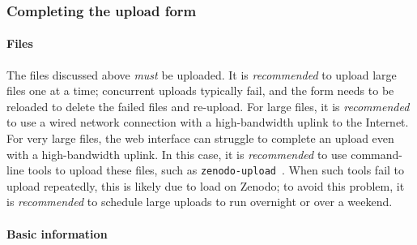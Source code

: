 \documentclass{article}
\newcommand\rfcword[1]{\emph{#1}\xspace}
\newcommand\must{\rfcword{must}}
\newcommand\recommended{\rfcword{recommended}}
\begin{document}
\subsubsection{Completing the upload form}\label{sec:upload-form}

\paragraph{Files}

The files discussed above \must be uploaded.
It is \recommended to upload large files one at a time;
concurrent uploads typically fail,
and the form needs to be reloaded to delete the failed files and re-upload.
For large files,
it is \recommended to use a wired network connection
with a high-bandwidth uplink to the Internet.
For very large files,
the web interface can struggle to complete an upload even with a high-bandwidth uplink.
In this case,
it is \recommended to use command-line tools to upload these files,
such as \verb|zenodo-upload|~\cite{zenodo-upload}.
When such tools fail to upload repeatedly,
this is likely due to load on Zenodo;
to avoid this problem,
it is \recommended to schedule large uploads to run overnight or over a weekend.

\paragraph{Basic information}
\end{document}
